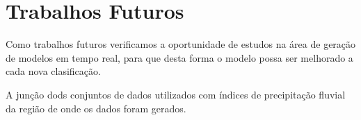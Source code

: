 \documentclass[
	12pt,				%
	openright,			%
	oneside,	
	a4paper,				%
	english,				%
	brazil				%
]{abntex2/abntex2} %
\begin{document}
	\section{Trabalhos Futuros}
	
	Como trabalhos futuros verificamos a oportunidade de estudos na área de geração de modelos em tempo real, para que desta forma o modelo possa ser melhorado a cada nova clasificação.
	
	A junção dods conjuntos de dados utilizados com índices de precipitação fluvial da região de onde os dados foram gerados.

\postextual
{}
%









\begin{anexosenv}



%

\end{anexosenv}
\end{document}
